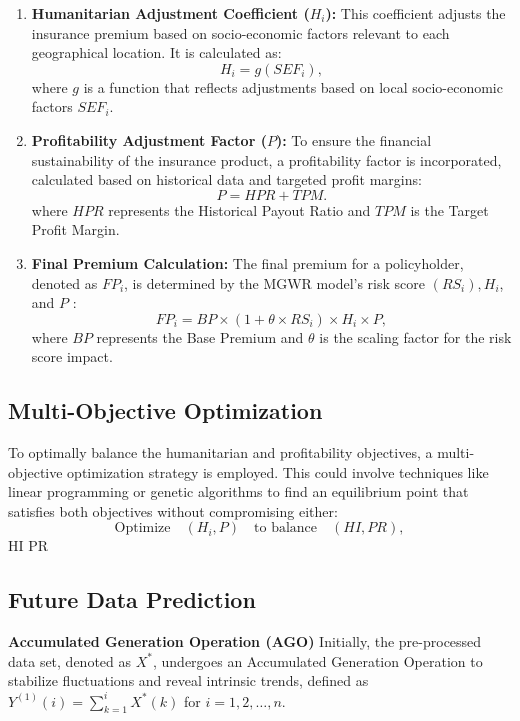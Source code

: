 \documentclass[12pt]{article}
\begin{document}
\begin{enumerate}
\item \textbf{Humanitarian Adjustment Coefficient ($H_i$):} This coefficient adjusts the insurance premium based on socio-economic factors relevant to each geographical location. It is calculated as:
\begin{equation}
H_i = g(SEF_i),
\label{equ:h}
\end{equation}
where $g$ is a function that reflects adjustments based on local socio-economic factors $S E F_i$.

\item \textbf{Profitability Adjustment Factor (\( P \)):} To ensure the financial sustainability of the insurance product, a profitability factor is incorporated, calculated based on historical data and targeted profit margins:
\begin{equation}
P = HPR + TPM.
\end{equation}
where $H P R$ represents the Historical Payout Ratio and $T P M$ is the Target Profit Margin.

\item \textbf{Final Premium Calculation:} The final premium for a policyholder, denoted as $F P_i$, is determined by the MGWR model's risk score $\left(R S_i\right), H_i$, and $P$ :
\begin{equation}
FP_i = BP \times (1 + \theta \times RS_i) \times H_i \times P,
\end{equation}
where $B P$ represents the Base Premium and $\theta$ is the scaling factor for the risk score impact.
\end{enumerate}

\subsection{Multi-Objective Optimization}

To optimally balance the humanitarian and profitability objectives, a multi-objective optimization strategy is employed. This could involve techniques like linear programming or genetic algorithms to find an equilibrium point that satisfies both objectives without compromising either:
\begin{equation}
\text{Optimize} \quad (H_i, P) \quad \text{to balance} \quad (HI, PR),
\end{equation}
 HI  PR 

\subsection{Future Data Prediction}
\textbf{Accumulated Generation Operation (AGO)}
Initially, the pre-processed data set, denoted as $X^*$, undergoes an Accumulated Generation Operation to stabilize fluctuations and reveal intrinsic trends, defined as $Y^{(1)}(i)=\sum_{k=1}^i X^*(k)$ for $i=1,2, \ldots, n$.
\end{document}
